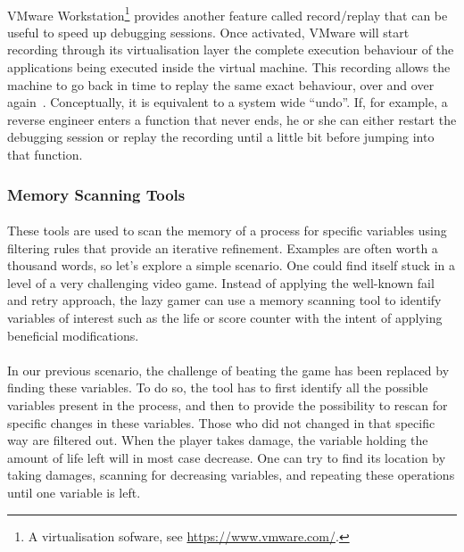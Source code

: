 \paragraph{} 
VMware Workstation\footnote{A virtualisation sofware, see \url{https://www.vmware.com/}.} provides another feature called record/replay that can be useful to speed up debugging sessions. Once activated, VMware will start recording through its virtualisation layer the complete execution behaviour of the applications being executed inside the virtual machine. This recording allows the machine to go back in time to replay the same exact behaviour, over and over again~\cite{vmware_record_replay}. Conceptually, it is equivalent to a system wide “undo”. If, for example, a reverse engineer enters a function that never ends, he or she can either restart the debugging session or replay the recording until a little bit before jumping into that function.

\subsubsection{Memory Scanning Tools}
\paragraph{}
These tools are used to scan the memory of a process for specific variables using filtering rules that provide an iterative refinement. Examples are often worth a thousand words, so let's explore a simple scenario. One could find itself stuck in a level of a very challenging video game. Instead of applying the well-known fail and retry approach, the lazy gamer can use a memory scanning tool to identify variables of interest such as the life or score counter with the intent of applying beneficial modifications.

\paragraph{}
In our previous scenario, the challenge of beating the game has been replaced by finding these variables. To do so, the tool has to first identify all the possible variables present in the process, and then to provide the possibility to rescan for specific changes in these variables. Those who did not changed in that specific way are filtered out. When the player takes damage, the variable holding the amount of life left will in most case decrease. One can try to find its location by taking damages, scanning for decreasing variables, and repeating these operations until one variable is left.

